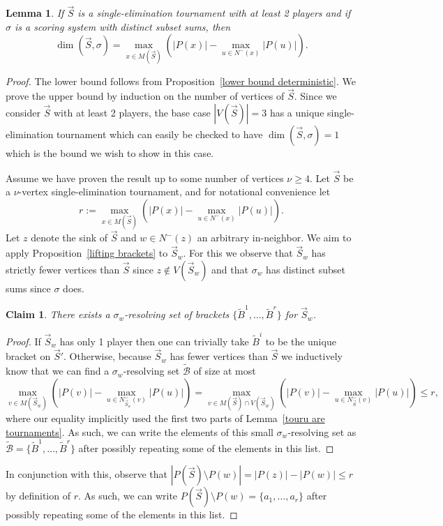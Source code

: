 \documentclass[12pt,letterpaper]{article}
\newtheorem{lem}[thm]{Lemma}
\newtheorem{claim}[thm]{Claim}
\theoremstyle{definition}
\newcommand{\sig}{\sigma}
\renewcommand{\1}{\mathbbm{1}}
\newcommand{\sm}{\setminus}
\renewcommand{\c}[1]{\mathcal{#1}}
\newcommand{\tour}{\vec{S}}
\begin{document}
\begin{lem}\label{tight deterministic}
	If $\tour$ is a single-elimination tournament with at least 2 players and if $\sig$ is a scoring system with distinct subset sums, then \[\dim(\tour,\sig)= \max_{x\in M(\tour)}\left( |P(x)|-\max_{u\in N^-(x)} |P(u)|\right).\]
\end{lem}
\begin{proof}
	The lower bound follows from Proposition~\ref{lower bound deterministic}.  We prove the upper bound by induction on the number of vertices of $\tour$.  Since we consider $\tour$ with at least 2 players, the base case $|V(\tour)|=3$ has a unique single-elimination tournament which can easily be checked to have $\dim(\tour,\sig)=1$ which is the bound we wish to show in this case.
	
	Assume we have proven the result up to some number of vertices $\nu\ge 4$.  Let $\tour$ be a $\nu$-vertex single-elimination tournament, and for notational convenience let
	\[r:= \max_{x\in M(\tour)}\left( |P(x)|-\max_{u\in N^-(x)} |P(u)|\right).\]  Let $z$ denote the sink of $\tour$ and $w\in N^-(z)$ an arbitrary in-neighbor.  We aim to apply Proposition~\ref{lifting brackets} to $\tour_w$.  For this we observe that $\tour_w$ has strictly fewer vertices than $\tour$ since $z\notin V(\tour_w)$ and that $\sig_w$ has distinct subset sums since $\sig$ does.
	
	\begin{claim}
		There exists a $\sig_w$-resolving set of brackets $\{\widetilde{B}^1,\ldots,\widetilde{B}^r\}$ for $\tour_w$. 
	\end{claim}
	\begin{proof}
		If $\tour_w$ has only 1 player then one can trivially take $\widetilde{B}^i$ to be the unique bracket on $\tour'$.  Otherwise, because $\tour_w$ has fewer vertices than $\tour$ we inductively know that we can find a $\sig_w$-resolving set $\widetilde{\c{B}}$ of size at most  \[\max_{v\in M(\tour_w)}\left( |P(v)|-\max_{u\in N^-_{\tour_w}(v)} |P(u)|\right)=\max_{v\in M(\tour)\cap V(\tour_w)}\left( |P(v)|-\max_{u\in N^-_{\tour}(v)} |P(u)|\right)\le r,\]
		where our equality implicitly used the first two parts of Lemma~\ref{touru are tournaments}.   As such, we can write the elements of this small $\sig_w$-resolving set as $\widetilde{\c{B}}=\{\widetilde{B}^1,\ldots,\widetilde{B}^r\}$ after possibly repeating some of the elements in this list.
	\end{proof}
	In conjunction with this, observe that $|P(\tour)\sm P(w)|=|P(z)|-|P(w)|\le r$ by definition of $r$.  As such, we can write $P(\tour)\sm P(w)=\{a_1,\ldots,a_r\}$  after possibly repeating some of the elements in this list.


\end{proof}
\end{document}

